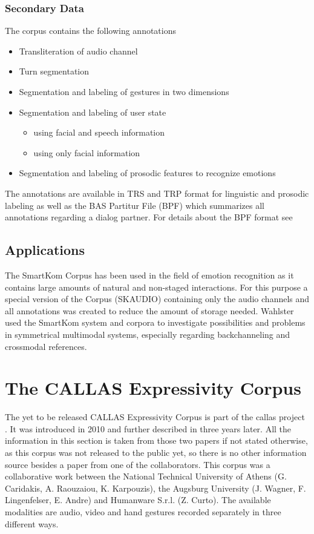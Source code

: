 \documentclass[a4paper]{article}
\begin{document}
		\subsubsection{Secondary Data}
			The corpus contains the following annotations
			\begin{itemize}
				\item Transliteration of audio channel 
				\item Turn segmentation
				\item Segmentation and labeling of gestures in two dimensions
				\item Segmentation and labeling of user state
				\begin{itemize}
					\item using facial and speech information
					\item using only facial information 
				\end{itemize}
				\item Segmentation and labeling of prosodic features to recognize emotions
			\end{itemize}
			The annotations are available in TRS and TRP format for linguistic and prosodic labeling as well as the BAS Partitur File (BPF) which summarizes all annotations regarding a dialog partner. For details about the BPF format see \cite{schiel2002integration}
				
		\subsection{Applications}
			The SmartKom Corpus has been used in the field of emotion recognition as it contains large amounts of natural and non-staged interactions. For this purpose a special version of the Corpus (SKAUDIO)\cite{basAUDIO} containing only the audio channels and all annotations was created to reduce the amount of storage needed. 
			Wahlster \cite{wahlster2003towards} used the SmartKom system and corpora to investigate possibilities and problems in symmetrical multimodal systems, especially regarding backchanneling and crossmodal references.
	
	
	\section{The CALLAS Expressivity Corpus}
		The yet to be released CALLAS Expressivity Corpus is part of the \gls{callas} project \cite{2010MultimodalCorpusForGestureExpressivity}. It was introduced in 2010 \cite{2010MultimodalCorpusForGestureExpressivity} and further described in \cite{Caridakis2013} three years later. All the information in this section is taken from those two papers if not stated otherwise, as this corpus was not released to the public yet, so there is no other information source besides a paper from one of the collaborators\cite{wagner:2011:1}. This corpus was a collaborative work between the National Technical University of Athens (G. Caridakis, A. Raouzaiou, K. Karpouzis), the Augsburg University (J. Wagner, F. Lingenfelser, E. Andre) and Humanware S.r.l. (Z. Curto). The available modalities are audio, video and hand gestures recorded separately in three different ways. 
\end{document}
